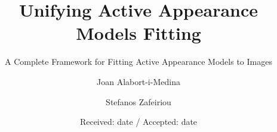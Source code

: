 \documentclass[twocolumn]{svjour3}          %
\begin{document}
\title{Unifying Active Appearance Models Fitting}

\subtitle{A Complete Framework for Fitting Active Appearance Models to Images}


\author{Joan Alabort-i-Medina  
        \and
        Stefanos Zafeiriou}



\date{Received: date / Accepted: date}

\maketitle
\end{document}
